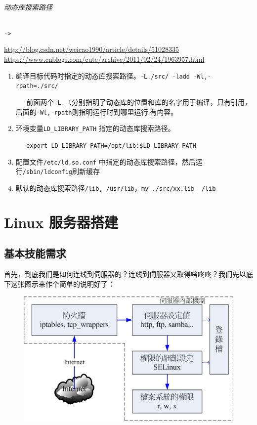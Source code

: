 \documentclass[UTF8,a4paper,12pt]{ctexbook}
\begin{document}
			
			\subparagraph{动态库搜索路径}\verb|->|
			
				\url{http://blog.csdn.net/weicao1990/article/details/51028335}			
				\url{https://www.cnblogs.com/cute/archive/2011/02/24/1963957.html}
				
				\begin{enumerate}[itemindent= 2em]
					\item 编译目标代码时指定的动态库搜索路径。\verb|-L./src/ -ladd -Wl,-rpath=./src/|
					
					\verb|   |前面两个\verb|-L -l|分别指明了动态库的位置和库的名字用于编译，只有引用， 后面的\verb|-Wl,-rpath|则指明运行时到哪里运行,有内容。
					
					\item 环境变量\verb|LD_LIBRARY_PATH| 指定的动态库搜索路径。
					
					\verb|   export LD_LIBRARY_PATH=/opt/lib:$LD_LIBRARY_PATH|
					\item 配置文件\verb|/etc/ld.so.conf| 中指定的动态库搜索路径，然后运行\verb|/sbin/ldconfig|刷新缓存
					\item 默认的动态库搜索路径\verb|/lib, /usr/lib|，\verb|mv ./src/xx.lib  /lib|
				\end{enumerate}
		
\chapter{Linux 服务器搭建}
	\section{基本技能需求}
		首先，到底我们是如何连线到伺服器的？连线到伺服器又取得啥咚咚？我们先以底下这张图示来作个简单的说明好了：
		
		\begin{figure}[h]
			\centering
			\includegraphics[scale = 0.8]{linuxServerExample.jpg}
		\end{figure}
		
\end{document}
